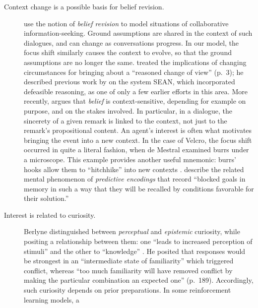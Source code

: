 \begin{description}                      
\item[Context change is a possible basis for belief revision.]
  \citet{logan1994modelling} use the notion of \emph{belief revision}
  to model situations of collaborative information-seeking.  Ground
  assumptions are shared in the context of such dialogues, and can
  change as conversations progress.  In our model, the focus shift
  similarly causes the context to evolve, so that the ground
  assumptions are no longer
  the same.  \citet{harman1986change} treated the implications of
  changing circumstances for bringing about a ``reasoned change of
  view'' (p.~3); he described previous work by
  \citet{Doyle:1980:MDA:889488} on the system {\sf SEAN}, which
  incorporated defeasible reasoning, as one of only a few earlier
  efforts in this area.  More recently, \citet{clarke2017assertion}
  argues that \emph{belief} is context-sensitive, depending for
  example on purpose, and on the stakes involved.  In particular, in a
  dialogue, the sincerety of a given remark is linked to the context,
  not just to the remark's propositional content.  An agent's
  interest is often what motivates bringing the event into a new context.
  In the case of Velcro\textsuperscript{\texttrademark}, the focus
  shift occurred in quite a literal fashion, when de Mestral examined
  burrs under a microscope.  This example provides another useful
  mnemonic: burrs' hooks allow them to ``hitchhike'' into new contexts
  \cite[]{jenkins2011bio}.
  \citet{patalano1993predictive} describe the related mental
  phenomenon of \emph{predictive encodings} that record ``blocked
  goals in memory in such a way that they will be recalled by
  conditions favorable for their solution.''
\item[Interest is related to curiosity.]  Berlyne distinguished
  between \emph{perceptual} and \emph{epistemic} curiosity, while
  positing a relationship between them: one ``leads to increased
  perception of stimuli'' and the other to ``knowledge''
  \cite[p.~180]{berlyne1954theory}.  He posited that responses would
  be strongest in an ``intermediate state of familiarity'' which
  triggered conflict, whereas ``too much familiarity will have removed
  conflict by making the particular combination an expected one''
  (p.~189).  Accordingly, such curiosity depends on prior
  preparations.  In some reinforcement learning models, a

\end{description}
